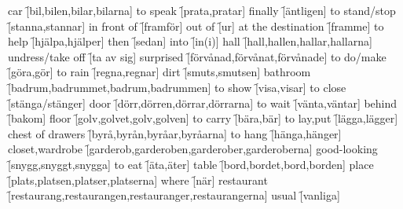 \begin{questions}
    \begin{multicols}{2}
        \raggedcolumns
        \question car \f[bil,bilen,bilar,bilarna]
        \question to speak \f[prata,pratar]
        \question finally \f[äntligen]
        \question to stand/stop \f[stanna,stannar]
        \question in front of \f[framför]
        \question out of \f[ur]
        \question at the destination \f[framme]
        \question to help \f[hjälpa,hjälper]
        \question then \f[sedan]
        \question into \f[in(i)]
        \question hall \f[hall,hallen,hallar,hallarna]
        \question undress/take off \f[ta av sig]
        \question surprised \f[förvånad,förvånat,förvånade]
        \question to do/make \f[göra,gör]
        \question to rain \f[regna,regnar]
        \question dirt \f[smuts,smutsen]
        \question bathroom \f[badrum,badrummet,badrum,badrummen]
        \question to show \f[visa,visar]
        \question to close \f[stänga/stänger]
        \question door \f[dörr,dörren,dörrar,dörrarna]
        \question to wait \f[vänta,väntar]
        \question behind \f[bakom]
        \question floor \f[golv,golvet,golv,golven]
        \question to carry \f[bära,bär]
        \question to lay,put \f[lägga,lägger]
        \question chest of drawers \f[byrå,byrån,byråar,byråarna]
        \question to hang \f[hänga,hänger]
        \question closet,wardrobe \f[garderob,garderoben,garderober,garderoberna]
        \question good-looking \f[snygg,snyggt,snygga]
        \question to eat \f[äta,äter]
        \question table \f[bord,bordet,bord,borden]
        \question place \f[plats,platsen,platser,platserna]
        \question where \f[när]
        \question restaurant \f[restaurang,restaurangen,restauranger,restaurangerna]
        \question usual \f[vanliga]
    \end{multicols}
\end{questions}